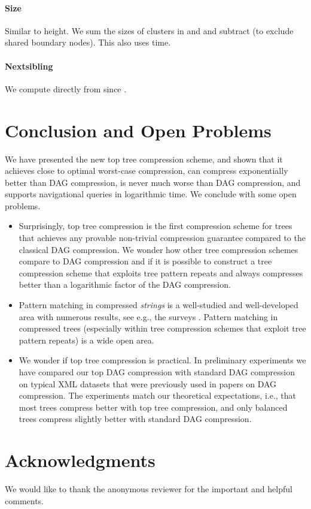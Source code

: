 \documentclass [11pt]{article}
\begin{document}
\paragraph{Size} Similar to height. We sum the sizes of clusters in  and  and subtract  (to exclude shared boundary nodes). This also uses  time.

\paragraph{Nextsibling} We compute  directly from  since . 




\section{Conclusion and Open Problems}
We have presented the new top tree compression scheme, and shown that it achieves close to optimal worst-case compression, can compress exponentially better than DAG compression, is never much worse than DAG compression, and supports navigational queries in logarithmic time. We conclude with some open problems.
\begin{itemize}
\item Surprisingly, top tree compression is the first compression scheme for trees that achieves any provable non-trivial compression guarantee compared to the classical DAG compression. We wonder how other tree compression schemes compare to DAG compression and if it is possible to construct a tree compression scheme that  exploits tree pattern repeats and always compresses better than a logarithmic factor of the DAG compression. 
\item Pattern matching in compressed \emph{strings} is a well-studied and well-developed area with numerous results, see e.g., the surveys \cite{Gasieniec1996,Rytter2004,Lohrey2012}. Pattern matching in compressed trees (especially within tree compression schemes that exploit tree pattern repeats) is a wide open area. 
\item We wonder if top tree compression is practical. In preliminary experiments we have compared our top DAG compression with standard DAG compression on typical XML datasets that were previously used in papers on DAG compression. The experiments match our theoretical expectations, i.e., that most trees compress better with top tree compression, and only balanced trees compress slightly better with standard DAG compression.
\end{itemize}




\section{Acknowledgments}
We would like to thank the anonymous reviewer for the important and helpful comments.







\end{document}
